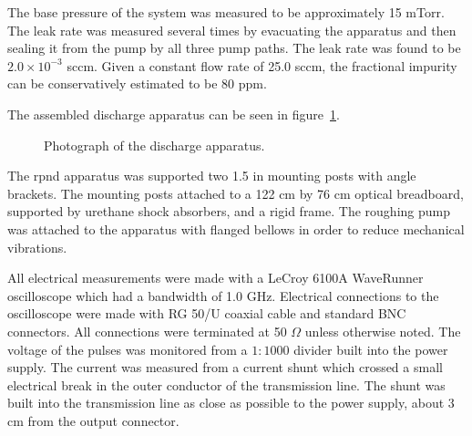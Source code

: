 The base pressure of the system was measured to be approximately 15 mTorr. The
leak rate was measured several times by evacuating the apparatus and then
sealing it from the pump by all three pump paths. The leak rate was found to be
$2.0\times 10^{-3}$ sccm. Given a constant flow rate of 25.0 sccm, the
fractional impurity can be conservatively estimated to be 80 ppm.

The assembled discharge apparatus can be seen in figure~\ref{fig:appphoto}.
\begin{figure}
  \centering
  \setlength\fboxsep{0pt}
  \setlength\fboxrule{1.0pt}
  \caption{Photograph of the discharge apparatus.}
  \label{fig:appphoto}
\end{figure}
The \acs{rpnd} apparatus was supported two 1.5 in mounting posts with angle
brackets. The mounting posts attached to a 122 cm by 76 cm optical breadboard,
supported by urethane shock absorbers, and a rigid frame. The roughing pump was
attached to the apparatus with flanged bellows in order to reduce mechanical
vibrations.

All electrical measurements were made with a LeCroy 6100A WaveRunner
oscilloscope which had a bandwidth of 1.0 GHz. Electrical connections to the
oscilloscope were made with RG 50/U coaxial cable and standard BNC connectors.
All connections were terminated at 50 $\Omega$ unless otherwise noted. The
voltage of the pulses was monitored from a $1:1000$ divider built into the power
supply. The current was measured from a current shunt which crossed a small
electrical break in the outer conductor of the transmission line. The shunt was
built into the transmission line as close as possible to the power supply, about
3 cm from the output connector.


